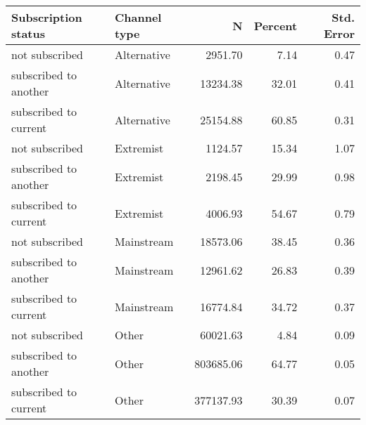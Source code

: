 \begin{table}[H]
\centering
\begin{tabular}[t]{llrrr}
\toprule
Subscription status & Channel type & N & Percent & Std. Error\\
\midrule
not subscribed & Alternative & 2951.70 & 7.14 & 0.47\\
subscribed to another & Alternative & 13234.38 & 32.01 & 0.41\\
subscribed to current & Alternative & 25154.88 & 60.85 & 0.31\\
not subscribed & Extremist & 1124.57 & 15.34 & 1.07\\
subscribed to another & Extremist & 2198.45 & 29.99 & 0.98\\
\addlinespace
subscribed to current & Extremist & 4006.93 & 54.67 & 0.79\\
not subscribed & Mainstream & 18573.06 & 38.45 & 0.36\\
subscribed to another & Mainstream & 12961.62 & 26.83 & 0.39\\
subscribed to current & Mainstream & 16774.84 & 34.72 & 0.37\\
not subscribed & Other & 60021.63 & 4.84 & 0.09\\
\addlinespace
subscribed to another & Other & 803685.06 & 64.77 & 0.05\\
subscribed to current & Other & 377137.93 & 30.39 & 0.07\\
\bottomrule
\end{tabular}
\end{table}
